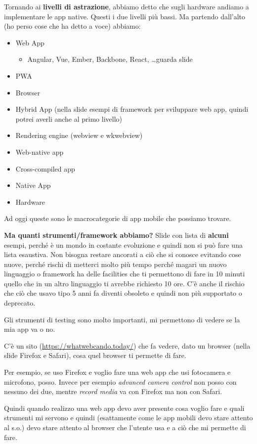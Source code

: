 \par Tornando ai \textbf{livelli di astrazione}, abbiamo detto che sugli hardware andiamo a implementare le app native. Questi i due livelli più bassi. Ma partendo dall'alto (ho perso cose che ha detto a voce) abbiamo:
\begin{itemize}
    \item Web App
    \begin{itemize}
        \item Angular, Vue, Ember, Backbone, React, \dots guarda slide 
    \end{itemize}
    \item PWA
    \item Browser
    \item Hybrid App (nella slide esempi di framework per sviluppare web app, quindi potrei averli anche al primo livello)
    \item Rendering engine (webview e wkwebview)
    \item Web-native app
    \item Cross-compiled app
    \item Native App
    \item Hardware
\end{itemize}
\par Ad oggi queste sono le macrocategorie di app mobile che possiamo trovare.
\par \textbf{Ma quanti strumenti/framework abbiamo?} Slide con lista di \textbf{alcuni} esempi, perché è un mondo in costante evoluzione e quindi non si può fare una lista esaustiva. Non bisogna restare ancorati a ciò che si conosce evitando cose nuove, perché rischi di metterci molto più tempo perché magari un nuovo linguaggio o framework ha delle facilities che ti permettono di fare in 10 minuti quello che in un altro linguaggio ti avrebbe richiesto 10 ore. C'è anche il rischio che ciò che usavo tipo 5 anni fa diventi obsoleto e quindi non più supportato o deprecato.
\par Gli strumenti di testing sono molto importanti, mi permettono di vedere se la mia app va o no. 
\par C'è un sito (\url{https://whatwebcando.today/}) che fa vedere, dato un browser (nella slide Firefox e Safari), cosa quel browser ti permette di fare.
\par Per esempio, se uso Firefox e voglio fare una web app che usi fotocamera e microfono, posso. Invece per esempio \textit{advanced camera control} non posso con nessuno dei due, mentre \textit{record media} va con Firefox ma non con Safari.
\par Quindi quando realizzo una web app devo aver presente cosa voglio fare e quali strumenti mi servono e quindi (esattamente come le app mobili devo stare attento al s.o.) devo stare attento al browser che l'utente usa e a ciò che mi permette di fare.

